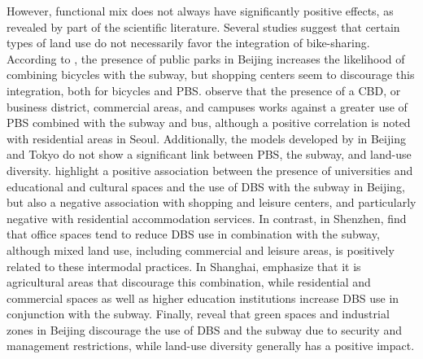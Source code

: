 \begin{refsegment}
However, functional mix does not always have significantly positive effects, as revealed by part of the scientific literature. Several studies suggest that certain types of land use do not necessarily favor the integration of bike-sharing. According to \textcolor{blue}{\textcite[56]{zhao_bicycle-metro_2017}}, the presence of public parks in Beijing increases the likelihood of combining bicycles with the subway, but shopping centers seem to discourage this integration, both for bicycles and \acrshort{PBS}. \textcolor{blue}{\textcite[9]{kim_analysis_2021}} observe that the presence of a \acrfull{CBD}, or business district, commercial areas, and campuses works against a greater use of \acrshort{PBS} combined with the subway and bus, although a positive correlation is noted with residential areas in Seoul. Additionally, the models developed by \textcolor{blue}{\textcite[214]{lin_built_2018}} in Beijing and Tokyo do not show a significant link between \acrshort{PBS}, the subway, and land-use diversity. \textcolor{blue}{\textcite[5]{zhou_spatially_2023}} highlight a positive association between the presence of universities and educational and cultural spaces and the use of \acrshort{DBS} with the subway in Beijing, but also a negative association with shopping and leisure centers, and particularly negative with residential accommodation services. In contrast, in Shenzhen, \textcolor{blue}{\textcite[17]{guo_dockless_2021}} find that office spaces tend to reduce \acrshort{DBS} use in combination with the subway, although mixed land use, including commercial and leisure areas, is positively related to these intermodal practices. In Shanghai, \textcolor{blue}{\textcite[9]{hu_examining_2022}} emphasize that it is agricultural areas that discourage this combination, while residential and commercial spaces as well as higher education institutions increase \acrshort{DBS} use in conjunction with the subway. Finally, \textcolor{blue}{\textcite[7]{liu_temporal_2022}} reveal that green spaces and industrial zones in Beijing discourage the use of \acrshort{DBS} and the subway due to security and management restrictions, while land-use diversity generally has a positive impact.%


\end{refsegment}
